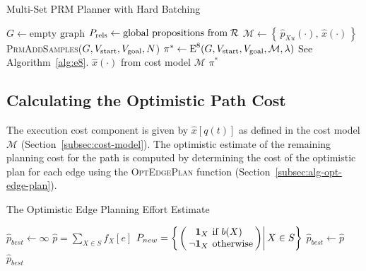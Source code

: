 \begin{algorithm}
\caption{Multi-Set PRM Planner with Hard Batching}
\label{alg:multi-set-prm-hard}
\begin{algorithmic}[1]
\State $G \leftarrow \mbox{empty graph}$
\State $P_{\mbox{\scriptsize rels}} \leftarrow
   \mbox{global propositions from\;} \mathcal{R}$
\State $\mathcal{M} \leftarrow
   \left\{ \, {\hat p}_{Xu}(\cdot), \, {\hat x}(\cdot) \, \right\}$
\Loop
   \State \textsc{PrmAddSamples}($G,
      V_{\mbox{\scriptsize start}}, V_{\mbox{\scriptsize goal}},
      N$)
   \State $\pi^* \leftarrow \mbox{E}^8(G,
      V_{\mbox{\scriptsize start}}, V_{\mbox{\scriptsize goal}},
      \mathcal{M}, \lambda)$
      \Comment See Algorithm~\ref{alg:e8}.
      \Comment $\hat{x}(\cdot)$ from cost model $\mathcal{M}$
      \State \Return $\pi^*$
   \EndIf
\EndLoop
\EndProcedure
\end{algorithmic}
\end{algorithm}

\subsection{Calculating the Optimistic Path Cost}
\label{subsec:alg-opt-path-cost}

The execution cost component is given by ${\hat x}[q(t)]$
as defined in the cost model $\mathcal{M}$
(Section~\ref{subsec:cost-model}).
The optimistic estimate of the remaining planning cost for the path
is computed by determining the cost of the optimistic plan for each
edge using the \textsc{OptEdgePlan} function
(Section~\ref{subsec:alg-opt-edge-plan}).

\begin{algorithm}
\caption{The Optimistic Edge Planning Effort Estimate}
\label{alg:opt-edge-plan}
\begin{algorithmic}[1]
   \State ${\hat p}_{best} \leftarrow \infty$
         \label{line:power-set}
      \State ${\hat p} = \sum_{X \in S} f_X[e]$
            \label{line:all-binary-functions}
         \State $\arraycolsep=2pt
            P_{new} =
            \left\{\left.\left( \begin{array}{rl}
            \mathbf{1}_X & \mbox{if } b(X) \\
            \lnot \mathbf{1}_X & \mbox{otherwise} \\
            \end{array} \right)
            \right|
            X \in S
            \right\}$
               \State ${\hat p}_{best} \leftarrow {\hat p}$
            \EndIf
         \EndIf
      \EndFor
   \EndFor
   \State \Return ${\hat p}_{best}$
\EndFunction
\end{algorithmic}
\end{algorithm}

